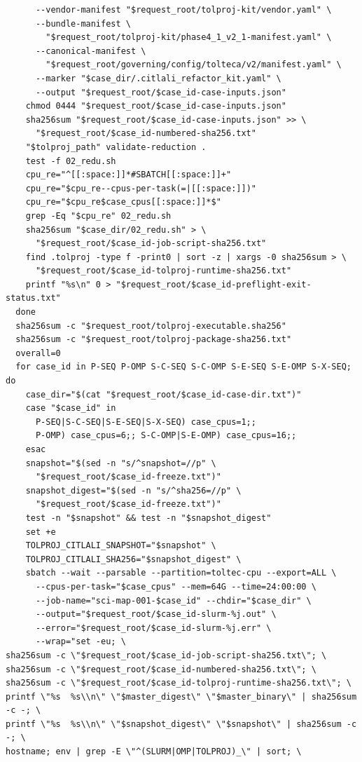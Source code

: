 \documentclass[11pt]{article}
\begin{document}
\begin{small}
\begin{verbatim}
      --vendor-manifest "$request_root/tolproj-kit/vendor.yaml" \
      --bundle-manifest \
        "$request_root/tolproj-kit/phase4_1_v2_1-manifest.yaml" \
      --canonical-manifest \
        "$request_root/governing/config/tolteca/v2/manifest.yaml" \
      --marker "$case_dir/.citlali_refactor_kit.yaml" \
      --output "$request_root/$case_id-case-inputs.json"
    chmod 0444 "$request_root/$case_id-case-inputs.json"
    sha256sum "$request_root/$case_id-case-inputs.json" >> \
      "$request_root/$case_id-numbered-sha256.txt"
    "$tolproj_path" validate-reduction .
    test -f 02_redu.sh
    cpu_re="^[[:space:]]*#SBATCH[[:space:]]+"
    cpu_re="$cpu_re--cpus-per-task(=|[[:space:]])"
    cpu_re="$cpu_re$case_cpus[[:space:]]*$"
    grep -Eq "$cpu_re" 02_redu.sh
    sha256sum "$case_dir/02_redu.sh" > \
      "$request_root/$case_id-job-script-sha256.txt"
    find .tolproj -type f -print0 | sort -z | xargs -0 sha256sum > \
      "$request_root/$case_id-tolproj-runtime-sha256.txt"
    printf "%s\n" 0 > "$request_root/$case_id-preflight-exit-status.txt"
  done
  sha256sum -c "$request_root/tolproj-executable.sha256"
  sha256sum -c "$request_root/tolproj-package-sha256.txt"
  overall=0
  for case_id in P-SEQ P-OMP S-C-SEQ S-C-OMP S-E-SEQ S-E-OMP S-X-SEQ; do
    case_dir="$(cat "$request_root/$case_id-case-dir.txt")"
    case "$case_id" in
      P-SEQ|S-C-SEQ|S-E-SEQ|S-X-SEQ) case_cpus=1;;
      P-OMP) case_cpus=6;; S-C-OMP|S-E-OMP) case_cpus=16;;
    esac
    snapshot="$(sed -n "s/^snapshot=//p" \
      "$request_root/$case_id-freeze.txt")"
    snapshot_digest="$(sed -n "s/^sha256=//p" \
      "$request_root/$case_id-freeze.txt")"
    test -n "$snapshot" && test -n "$snapshot_digest"
    set +e
    TOLPROJ_CITLALI_SNAPSHOT="$snapshot" \
    TOLPROJ_CITLALI_SHA256="$snapshot_digest" \
    sbatch --wait --parsable --partition=toltec-cpu --export=ALL \
      --cpus-per-task="$case_cpus" --mem=64G --time=24:00:00 \
      --job-name="sci-map-001-$case_id" --chdir="$case_dir" \
      --output="$request_root/$case_id-slurm-%j.out" \
      --error="$request_root/$case_id-slurm-%j.err" \
      --wrap="set -eu; \
sha256sum -c \"$request_root/$case_id-job-script-sha256.txt\"; \
sha256sum -c \"$request_root/$case_id-numbered-sha256.txt\"; \
sha256sum -c \"$request_root/$case_id-tolproj-runtime-sha256.txt\"; \
printf \"%s  %s\\n\" \"$master_digest\" \"$master_binary\" | sha256sum -c -; \
printf \"%s  %s\\n\" \"$snapshot_digest\" \"$snapshot\" | sha256sum -c -; \
hostname; env | grep -E \"^(SLURM|OMP|TOLPROJ)_\" | sort; \

\end{verbatim}
\end{small}
\end{document}
